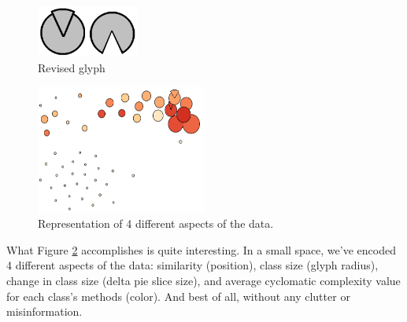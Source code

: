 \begin{figure}[H]
  \centering
  \includegraphics[width=0.3\textwidth]{figures/glyphs_2.png}
  \caption{Revised glyph}
  \label{fig:glyphs2}
\end{figure}

\begin{figure}[H]
  \centering
  \includegraphics[width=0.5\textwidth]{figures/glyphs_4.png}
  \caption{Representation of 4 different aspects of the data.}
  \label{fig:glyphs4}
\end{figure}

What Figure \ref{fig:glyphs4} accomplishes is quite interesting. In a small space, we've encoded 4 different aspects of the data: similarity (position), class size (glyph radius), change in class size (delta pie slice size), and average cyclomatic complexity value for each class's methods (color). And best of all, without any clutter or misinformation.
